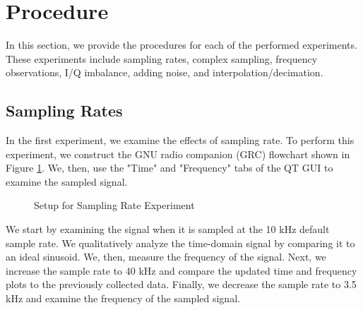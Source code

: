 \documentclass{article}
\begin{document}
\section{Procedure}


In this section, we provide the procedures for each of the performed experiments. These experiments include sampling rates, complex sampling, frequency observations, I/Q imbalance, adding noise, and interpolation/decimation.

\subsection{Sampling Rates \label{subsection::sampling_rates}}

In the first experiment, we examine the effects of sampling rate. To perform this experiment, we construct the GNU radio companion (GRC) flowchart shown in Figure \ref{fig::sampling_rates_experiment}. We, then, use the "Time" and "Frequency" tabs of the QT GUI to examine the sampled signal.

\begin{figure}[H]
	\centerline{}
	\caption{Setup for Sampling Rate Experiment}
	\label{fig::sampling_rates_experiment}
\end{figure}

We start by examining the signal when it is sampled at the 10 kHz default sample rate. We qualitatively analyze the time-domain signal by comparing it to an ideal sinusoid. We, then, measure the frequency of the signal. Next, we increase the sample rate to 40 kHz and compare the updated time and frequency plots to the previously collected data. Finally, we decrease the sample rate to 3.5 kHz and examine the frequency of the sampled signal.
\end{document}
